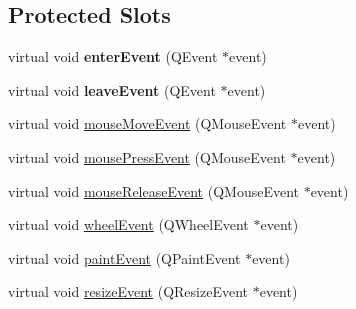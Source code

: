 \subsection*{Protected Slots}
\begin{DoxyCompactItemize}
\item 
\mbox{\label{class_paint_q_label_acd3f55d30aa890678038ec613aad2834}} 
virtual void {\bfseries enter\+Event} (Q\+Event $\ast$event)
\item 
\mbox{\label{class_paint_q_label_abc3c503a911edd5df1a3d21aec89d583}} 
virtual void {\bfseries leave\+Event} (Q\+Event $\ast$event)
\item 
virtual void \hyperlink{class_paint_q_label_ae91b4ba28c7f30de7bfe0ece3011b8d6}{mouse\+Move\+Event} (Q\+Mouse\+Event $\ast$event)
\item 
virtual void \hyperlink{class_paint_q_label_a222bf479767638c91bb0b8b655e9794b}{mouse\+Press\+Event} (Q\+Mouse\+Event $\ast$event)
\item 
virtual void \hyperlink{class_paint_q_label_a16f35714b89231d55c733ef94f583ff4}{mouse\+Release\+Event} (Q\+Mouse\+Event $\ast$event)
\item 
virtual void \hyperlink{class_paint_q_label_adcf7154233dfb4462c1cdd4531ab74ba}{wheel\+Event} (Q\+Wheel\+Event $\ast$event)
\item 
virtual void \hyperlink{class_paint_q_label_adc08981924e300cd568881da8d321083}{paint\+Event} (Q\+Paint\+Event $\ast$event)
\item 
virtual void \hyperlink{class_paint_q_label_aec6344135e411064b52d5376650b48ef}{resize\+Event} (Q\+Resize\+Event $\ast$event)
\end{DoxyCompactItemize}
